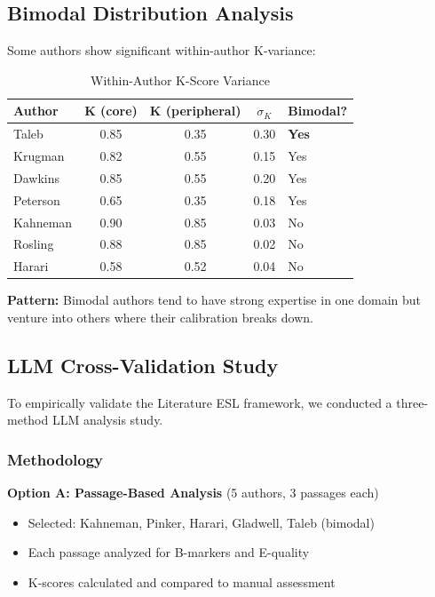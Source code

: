 \documentclass[11pt,a4paper]{article}
\begin{document}
\subsection{Bimodal Distribution Analysis}

Some authors show significant within-author K-variance:

\begin{table}[h]
\centering
\caption{Within-Author K-Score Variance}
\begin{tabular}{lcccl}
\toprule
\textbf{Author} & \textbf{K (core)} & \textbf{K (peripheral)} & \textbf{$\sigma_K$} & \textbf{Bimodal?} \\
\midrule
Taleb & 0.85 & 0.35 & 0.30 & \textbf{Yes} \\
Krugman & 0.82 & 0.55 & 0.15 & Yes \\
Dawkins & 0.85 & 0.55 & 0.20 & Yes \\
Peterson & 0.65 & 0.35 & 0.18 & Yes \\
\midrule
Kahneman & 0.90 & 0.85 & 0.03 & No \\
Rosling & 0.88 & 0.85 & 0.02 & No \\
Harari & 0.58 & 0.52 & 0.04 & No \\
\bottomrule
\end{tabular}
\end{table}

\textbf{Pattern:} Bimodal authors tend to have strong expertise in one domain but venture into others where their calibration breaks down.

\subsection{LLM Cross-Validation Study}
\label{subsec:llm-validation}

To empirically validate the Literature ESL framework, we conducted a three-method LLM analysis study.

\subsubsection{Methodology}

\textbf{Option A: Passage-Based Analysis} (5 authors, 3 passages each)
\begin{itemize}
    \item Selected: Kahneman, Pinker, Harari, Gladwell, Taleb (bimodal)
    \item Each passage analyzed for B-markers and E-quality
    \item K-scores calculated and compared to manual assessment
\end{itemize}
\end{document}
